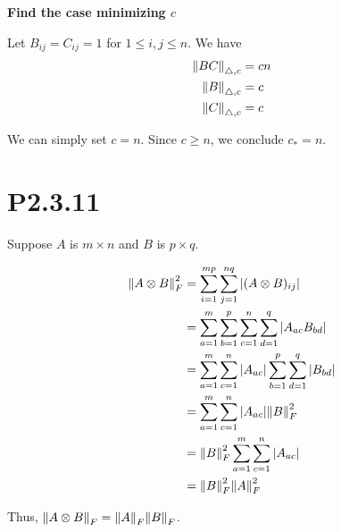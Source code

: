 \documentclass{article}
\begin{document}
\textbf{Find the case minimizing $c$}

Let $B_{ij}=C_{ij}=1$ for $1 \le i,j \le n$. We have
\begin{align*}
    \norm{BC}_{\triangle, c} & = cn \\
    \norm{B}_{\triangle, c}  & =c   \\
    \norm{C}_{\triangle, c}  & =c
\end{align*}

We can simply set $c=n$. Since $c \ge n$, we
conclude $c_* = n$.

\section*{P2.3.11}
Suppose $A$ is $m\times n$ and $B$ is $p\times q$.

\begin{align*}
    \norm{A\otimes B}_F^2
     & = \sum_{i=1}^{mp} \sum_{j=1}^{nq}
    |(A\otimes B)_{ij}|                                                         \\
     & = \sum_{a=1}^m \sum_{b=1}^p \sum_{c=1}^n \sum_{d=1}^q
    |A_{ac}B_{bd}|                                                              \\
     & = \sum_{a=1}^m \sum_{c=1}^n |A_{ac}| \sum_{b=1}^p  \sum_{d=1}^q |B_{bd}| \\
     & = \sum_{a=1}^m \sum_{c=1}^n |A_{ac}| \norm{B}_F^2                        \\
     & = \norm{B}_F^2  \sum_{a=1}^m \sum_{c=1}^n |A_{ac}|                       \\
     & =  \norm{B}_F^2  \norm{A}_F^2
\end{align*}

Thus, $\norm{A\otimes B}_F = \norm{A}_F \norm{B}_F$.
\end{document}
